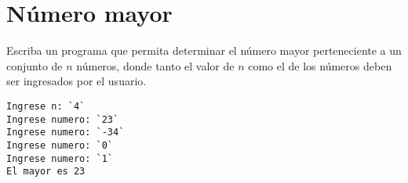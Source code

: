 \section{Número mayor}

Escriba un programa que permita determinar el número mayor perteneciente
a un conjunto de \(n\) números, donde tanto el valor de \(n\) como
el de los números deben ser ingresados por el usuario.

\begin{lstlisting}[language=testcase]
Ingrese n: `4`
Ingrese numero: `23`
Ingrese numero: `-34`
Ingrese numero: `0`
Ingrese numero: `1`
El mayor es 23
\end{lstlisting}

